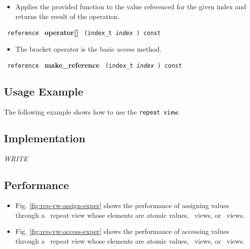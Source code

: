 \begin{itemize}
\item
Applies the provided function to the value referenced for the given index and returns the result of the operation.
\end{itemize}

\noindent
\texttt{%
reference
}
\newline
\textbf{operator[]}%
\texttt{%
(index\_t
\textit{%
index
}
) const
}

\begin{itemize}
\item
The bracket operator is the basic access method.
\end{itemize}

\noindent
\texttt{%
reference
}
\newline
\textbf{make\_reference}%
\texttt{%
(index\_t
\textit{index}%
) const
}

\subsection{Usage Example} \label{sec-rep-vw-use}

The following example shows how to use the \texttt{repeat view}:


\subsection{Implementation} \label{sec-rep-vw-impl}

\textit{WRITE}

\subsection{Performance} \label{sec-rep-vw-perf}

\begin{itemize}
\item
Fig. \ref{fig:rep-vw-assign-exper}
shows the performance of assigning values through a \stapl\ repeat view
whose elements are atomic values, \stl\ views, or \stapl\ views.
\item
Fig. \ref{fig:rep-vw-access-exper}
shows the performance of accessing values through a \stapl\ repeat view
whose elements are atomic values, \stl\ views, or \stapl\ views.
\end{itemize}

